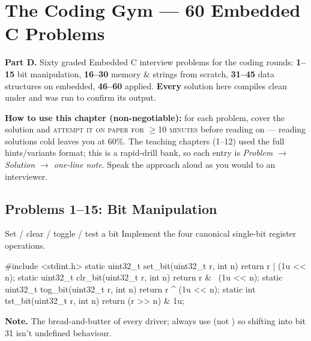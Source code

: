 \chapter{The Coding Gym --- 60 Embedded C Problems}
\label{ch:coding-gym}

\begin{partnote}
\textbf{Part D.} Sixty graded Embedded C interview problems for the coding
rounds: \textbf{1--15} bit manipulation, \textbf{16--30} memory \& strings from
scratch, \textbf{31--45} data structures on embedded, \textbf{46--60} applied.
\textbf{Every} solution here compiles clean under
 and was run to confirm its output.

\medskip
\textbf{How to use this chapter (non-negotiable):} for each problem, cover the
solution and \textsc{attempt it on paper for $\ge$10 minutes} before reading on
--- reading solutions cold leaves you at 60\%. The teaching chapters (1--12)
used the full hints/variants format; this is a rapid-drill bank, so each entry
is \emph{Problem $\rightarrow$ Solution $\rightarrow$ one-line note}. Speak the
approach aloud as you would to an interviewer.
\end{partnote}

\section{Problems 1--15: Bit Manipulation}
\attempt

\begin{gymproblem}{Set / clear / toggle / test a bit}
Implement the four canonical single-bit register operations.
\begin{cgym}
#include <stdint.h>
static uint32_t set_bit(uint32_t r, int n) { return r |  (1u << n); }
static uint32_t clr_bit(uint32_t r, int n) { return r & ~(1u << n); }
static uint32_t tog_bit(uint32_t r, int n) { return r ^  (1u << n); }
static int      tst_bit(uint32_t r, int n) { return (r >> n) & 1u; }
\end{cgym}
\textbf{Note.} The bread-and-butter of every driver; always use  (not
) so shifting into bit 31 isn't undefined behaviour.
\end{gymproblem}

